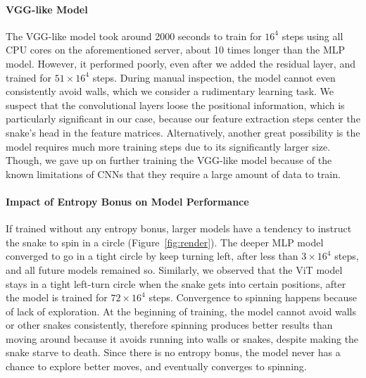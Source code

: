 \documentclass[conference]{IEEEtran}
\begin{document}
\paragraph{VGG-like Model}
The VGG-like model took around 2000 seconds to train for $16^4$ steps using all
CPU cores on the aforementioned server,
about 10 times longer than the MLP model. However, it performed poorly,
even after we added the residual layer, and trained for $51 \times 16^4$ steps.
During manual inspection, the model cannot even consistently avoid walls,
which we consider a rudimentary learning task.
We suspect that the convolutional layers loose the positional information,
which is particularly significant in our case,
because our feature extraction steps center the snake's head in the feature
matrices. Alternatively,
another great possibility is the model requires much more training steps due to
its significantly larger size. Though,
we gave up on further training the VGG-like model because of the known
limitations of CNNs that they require a large amount of data to train.

\paragraph{Impact of Entropy Bonus on Model Performance}
If trained without any entropy bonus,
larger models have a tendency to instruct the snake to spin in a circle
(Figure~\ref{fig:render}).
The deeper MLP model converged to go in a tight circle by keep turning left,
after less than $3\times 16^4$ steps, and all future models remained so.
Similarly,
we observed that the ViT model stays in a tight left-turn circle when the
snake gets into certain positions,
after the model is trained for $72\times 16^4$ steps.
Convergence to spinning happens because of lack of exploration.
At the beginning of training,
the model cannot avoid walls or other snakes consistently,
therefore spinning produces better results than moving around because it avoids
running into walls or snakes, despite making the snake starve to death.
Since there is no entropy bonus,
the model never has a chance to explore better moves,
and eventually converges to spinning.
\end{document}
